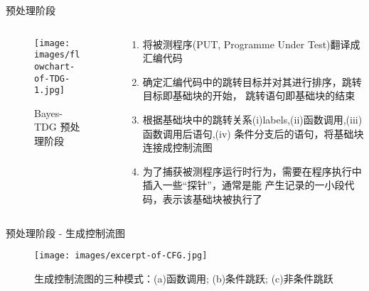 \documentclass{beamer}
\begin{document}
    \begin{frame}{预处理阶段}
        \begin{columns}[T]
        \begin{column}{.35\textwidth}
            \begin{figure}[!ht]
                \centering
                \texttt{[image: images/flowchart-of-TDG-1.jpg]}
                \caption{Bayes-TDG 预处理阶段}
                \label{fig:bayes-TDG-flowchart-1}
            \end{figure}
        \end{column}
        \begin{column}{.63\textwidth}
            \begin{enumerate}
                \item 将被测程序(PUT, Programme Under Test)翻译成汇编代码\pause
                \item 确定汇编代码中的跳转目标并对其进行排序，跳转目标即基础块的开始，
                      跳转语句即基础块的结束\pause
                \item 根据基础块中的跳转关系(i)labels,(ii)函数调用,(iii)函数调用后语句,(iv)
                      条件分支后的语句，将基础块连接成控制流图\pause
                \item 为了捕获被测程序运行时行为，需要在程序执行中插入一些``探针''，通常是能
                      产生记录的一小段代码，表示该基础块被执行了
            \end{enumerate}
        \end{column}
        \end{columns}
    \end{frame}

    \begin{frame}{预处理阶段 - 生成控制流图}
        \begin{figure}[!ht]
            \centering
            \texttt{[image: images/excerpt-of-CFG.jpg]}
            \caption{生成控制流图的三种模式：(a)函数调用; (b)条件跳跃; (c)非条件跳跃}
            \label{fig:excerpt-of-CFG}
        \end{figure}
    \end{frame}
\end{document}

